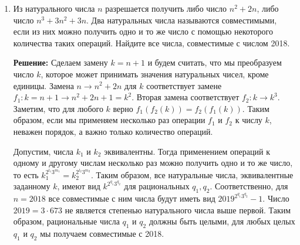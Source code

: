 \documentclass[a4paper,12pt]{article}
\begin{document}
\begin{enumerate}[label=\textbf{Задача \arabic*.}]
Пусть клетки, покрытой четырьмя квадратами из семейства, не найдется. Поместим в каждую клетку множества единичный заряд. Теперь пусть каждая клетка, покрытая $k$ квадратами из семейства, отдает каждому из этих квадратов по $1/k$ заряда (таким образом, раздаст весь свой заряд). Тогда каждый квадрат семейства получил заряд не меньше 2, потому что минимум от одной клетки получил 1, и от остальных получал не меньше 1/3 от каждой. Итого, всего полученного заряда не меньше чем дважды число квадратов в семействе, а отданного заряда не больше $S$, итого квадратов в семействе не больше $S/2$.

Теперь построим пример, доказывающий, что $f(n) \ge \frac{1}{2}n^2 - 4n$, следовательно неравенство $f(n) \le Cn^2$ при $C < \frac{1}{2}$ неверно при всех достаточно больших $n$.

Возьмем бесконечную клетчатую плоскость и покрасим ее в два цвета следующим образом: выберем одно из двух направлений диагонали, покрасим все клетки каждой диагонали в один цвет: две диагонали в белый, следующие две в черный и так далее с периодом 4. Теперь выберем квадрат $n \times n$, в который черных клеток попало не меньше чем белых, то есть хотя бы $n^2/2$. Теперь на каждую черную клетку внутри квадрата $n \times n$ положим квадрат $2 \times 2$ так, чтобы кроме этой черной клетки квадрат содержал только белые (это можно сделать единственным образом). Удалим все квадраты $2 \times 2$, частично вылезшие за границы квадрата $n \times n$, их не больше $4n$. Требуемое семейство построено.

\item Из натурального числа $n$ разрешается получить либо число $n^2 + 2n$, либо число $n^3 + 3n^2 + 3n$. Два натуральных числа называются совместимыми, если из них можно получить одно и то же число с помощью некоторого количества таких операций. Найдите все числа, совместимые с числом 2018.

\textbf{Решение:} Сделаем замену $k = n + 1$ и будем считать, что мы преобразуем число $k$, которое может принимать значения натуральных чисел, кроме единицы. Замена $n \to n^2 + 2n$ для $k$ соответствует замене $f_1: k = n + 1 \to n^2 + 2n + 1 = k^2$. Вторая замена соответствует $f_2: k \to k^3$. Заметим, что для любого $k$ верно $f_1(f_2(k)) = f_2(f_1(k))$. Таким образом, если мы применяем несколько раз операции $f_1$ и $f_2$ к числу $k$, неважен порядок, а важно только количество операций.

Допустим, числа $k_1$ и $k_2$ эквивалентны. Тогда применением операций к одному и другому числам несколько раз можно получить одно и то же число, то есть $k_1^{2^{l_1}3^{m_1}} = k_2^{2^{l_2}3^{m_2}}$. Таким образом, все натуральные числа, эквивалентные заданному $k$, имеют вид $k^{2^{q_1}3^{q_2}}$ для рациональных $q_1, q_2$. Соответственно, для $n=2018$ все совместимые с ним числа будут иметь вид $2019^{2^{q_1}3^{q_2}} - 1$. Число $2019=3 \cdot 673$ не является степенью натурального числа выше первой. Таким образом, рациональные числа $q_1$ и $q_2$ должны быть целыми, для любых целых $q_1$ и $q_2$ мы получаем совместимые с 2018.


\end{enumerate}
\end{document}
